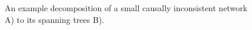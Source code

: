 \begin{figure}
\captionsetup{format=plain}
\caption[Decomposition of Spanning Trees]{An example decomposition of a small causally inconsistent network A) to its spanning trees B)\cite{Vasilyev2014}.}
\label{fig:sst_schematic}
\end{figure}




